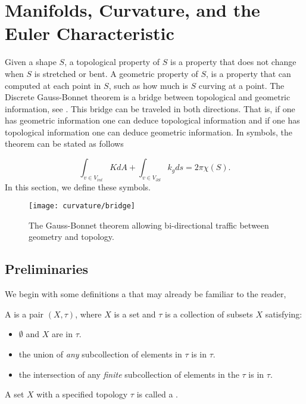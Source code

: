 
\section{Manifolds, Curvature, and the Euler Characteristic}
\label{sec:cast}



Given a shape $S$, a topological property of $S$  is a property that does
not change when $S$ is stretched or bent.
A geometric  property of $S$, is a property that can computed at each point in
$S$, such as how much is $S$ curving at a point.
The Discrete Gauss-Bonnet theorem is a bridge between topological
and geometric information, see . This bridge can be traveled in both directions.
That is, if one has geometric information one can deduce topological information and
if one has topological information one can deduce geometric information.
In symbols, the theorem can be stated as follows

\begin{equation} \label{eqn:g-b}
\int_{v\in V_{int}} K dA + \int_{v\in V_{\partial S}} k_g ds = 2\pi \chi(S).
\end{equation}
In this section, we define these symbols.

\begin{figure}[htb]
\centering
\texttt{[image: curvature/bridge]}
\caption{The Gauss-Bonnet theorem allowing bi-directional traffic
between geometry and topology.}
\label{fig:bridge}
\end{figure}

\subsection{Preliminaries}

We begin with some definitions a that may already be familiar to the reader,
\begin{definition}
A  is a pair $(X,\tau)$, where $X$ is a set and
 $\tau$ is a collection of subsets $X$
satisfying:
	\begin{itemize}
		\item $\emptyset$ and $X$ are in $\tau.$
		\item the union of \emph{any} subcollection of elements in $\tau$ is  in $\tau.$
		\item the intersection of any \emph{finite} subcollection of elements in the $\tau$ is in $\tau.$
	\end{itemize}
A set $X$ with a specified topology $\tau$ is called a .
\end{definition}

